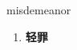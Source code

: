 
\begin{frame}
{\huge misdemeanor}
\begin{center}
\begin{enumerate}\Large
  \item \textbf{轻罪}
\end{enumerate}
\end{center}
\end{frame}
